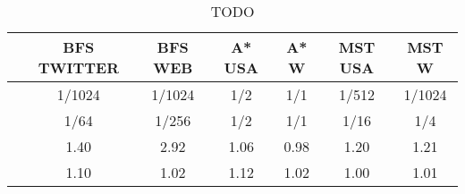 \begin{table}[h]
\centring
\begin{tabular}{ |c|c|c|c|c|c|c| }
\hline
 & \large{\textbf{BFS TWITTER}} & \large{\textbf{BFS WEB}} & \large{\textbf{A* USA}} & \large{\textbf{A* W}} & \large{\textbf{MST USA}} & \large{\textbf{MST W}} \\
\hline
\insprob{} & 1/1024 & 1/1024 & 1/2 & 1/1 & 1/512 & 1/1024 \\
\hline
\delprob{} & 1/64 & 1/256 & 1/2 & 1/1 & 1/16 & 1/4 \\
\hline
\speed{} & 1.40 & 2.92 & 1.06 & 0.98 & 1.20 & 1.21 \\
\hline
\workinc{} & 1.10 & 1.02 & 1.12 & 1.02 & 1.00 & 1.01 \\
\hline
\end{tabular}
\vspace{0.3em}
\caption{TODO }
\label{table:todo}
\end{table}
